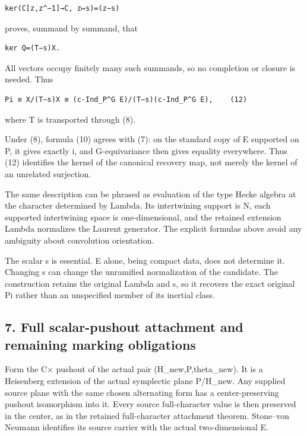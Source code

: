 \begin{Verbatim}[fontsize=\small,breaklines=true,breakanywhere=true]
ker(C[z,z^−1]→C, z↦s)=(z−s)
\end{Verbatim}

proves, summand by summand, that

\begin{Verbatim}[fontsize=\small,breaklines=true,breakanywhere=true]
ker Q=(T−s)X.
\end{Verbatim}

All vectors occupy finitely many such summands, so no completion or
closure is needed. Thus

\begin{Verbatim}[fontsize=\small,breaklines=true,breakanywhere=true]
Pi ≅ X/(T−s)X ≅ (c-Ind_P^G E)/(T−s)(c-Ind_P^G E),    (12)
\end{Verbatim}

where T is transported through (8).

Under (8), formula (10) agrees with (7): on the standard copy of E
supported on P, it gives exactly i, and G-equivariance then gives
equality everywhere. Thus (12) identifies the kernel of the canonical
recovery map, not merely the kernel of an unrelated surjection.

The same description can be phrased as evaluation of the type Hecke
algebra at the character determined by Lambda. Its intertwining support
is N, each supported intertwining space is one-dimensional, and the
retained extension Lambda normalizes the Laurent generator. The explicit
formulas above avoid any ambiguity about convolution orientation.

The scalar s is essential. E alone, being compact data, does not
determine it. Changing s can change the unramified normalization of the
candidate. The construction retains the original Lambda and s, so it
recovers the exact original Pi rather than an unspecified member of its
inertial class.

\hypertarget{rank2-full-scalar-pushout-attachment-and-remaining-marking-obligations}{%
\subsection{7. Full scalar-pushout attachment and remaining marking
obligations}\label{rank2-full-scalar-pushout-attachment-and-remaining-marking-obligations}}

Form the C× pushout of the actual pair (H\_new,P,theta\_new). It is a
Heisenberg extension of the actual symplectic plane P/H\_new. Any
supplied source plane with the same chosen alternating form has a
center-preserving pushout isomorphism into it. Every source
full-character value is then preserved in the center, as in the retained
full-character attachment theorem. Stone--von Neumann identifies its
source carrier with the actual two-dimensional E.

